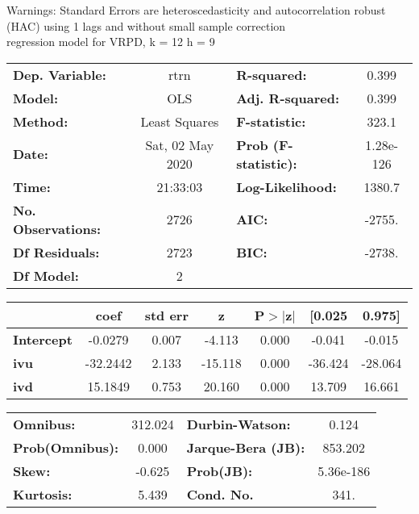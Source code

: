 Warnings: \newline
 [1] Standard Errors are heteroscedasticity and autocorrelation robust (HAC) using 1 lags and without small sample correction\\ 

regression model for VRPD, k = 12 h = 9\begin{center}
\begin{tabular}{lclc}
\toprule
\textbf{Dep. Variable:}    &       rtrn       & \textbf{  R-squared:         } &     0.399   \\
\textbf{Model:}            &       OLS        & \textbf{  Adj. R-squared:    } &     0.399   \\
\textbf{Method:}           &  Least Squares   & \textbf{  F-statistic:       } &     323.1   \\
\textbf{Date:}             & Sat, 02 May 2020 & \textbf{  Prob (F-statistic):} & 1.28e-126   \\
\textbf{Time:}             &     21:33:03     & \textbf{  Log-Likelihood:    } &    1380.7   \\
\textbf{No. Observations:} &        2726      & \textbf{  AIC:               } &    -2755.   \\
\textbf{Df Residuals:}     &        2723      & \textbf{  BIC:               } &    -2738.   \\
\textbf{Df Model:}         &           2      & \textbf{                     } &             \\
\bottomrule
\end{tabular}
\begin{tabular}{lcccccc}
                   & \textbf{coef} & \textbf{std err} & \textbf{z} & \textbf{P$> |$z$|$} & \textbf{[0.025} & \textbf{0.975]}  \\
\midrule
\textbf{Intercept} &      -0.0279  &        0.007     &    -4.113  &         0.000        &       -0.041    &       -0.015     \\
\textbf{ivu}       &     -32.2442  &        2.133     &   -15.118  &         0.000        &      -36.424    &      -28.064     \\
\textbf{ivd}       &      15.1849  &        0.753     &    20.160  &         0.000        &       13.709    &       16.661     \\
\bottomrule
\end{tabular}
\begin{tabular}{lclc}
\textbf{Omnibus:}       & 312.024 & \textbf{  Durbin-Watson:     } &     0.124  \\
\textbf{Prob(Omnibus):} &   0.000 & \textbf{  Jarque-Bera (JB):  } &   853.202  \\
\textbf{Skew:}          &  -0.625 & \textbf{  Prob(JB):          } & 5.36e-186  \\
\textbf{Kurtosis:}      &   5.439 & \textbf{  Cond. No.          } &      341.  \\
\bottomrule
\end{tabular}
\end{center}

